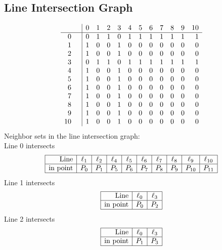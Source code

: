\documentclass{article}
\begin{document}
{\subsection*{Line Intersection Graph}
{\arraycolsep=1pt
$$
\begin{array}{rr|*{11}r}
 &  & 0 & 1 & 2 & 3 & 4 & 5 & 6 & 7 & 8 & 9 & 10\\
\hline
0 &  & 0 & 1 & 1 & 0 & 1 & 1 & 1 & 1 & 1 & 1 & 1\\
1 &  & 1 & 0 & 0 & 1 & 0 & 0 & 0 & 0 & 0 & 0 & 0\\
2 &  & 1 & 0 & 0 & 1 & 0 & 0 & 0 & 0 & 0 & 0 & 0\\
3 &  & 0 & 1 & 1 & 0 & 1 & 1 & 1 & 1 & 1 & 1 & 1\\
4 &  & 1 & 0 & 0 & 1 & 0 & 0 & 0 & 0 & 0 & 0 & 0\\
5 &  & 1 & 0 & 0 & 1 & 0 & 0 & 0 & 0 & 0 & 0 & 0\\
6 &  & 1 & 0 & 0 & 1 & 0 & 0 & 0 & 0 & 0 & 0 & 0\\
7 &  & 1 & 0 & 0 & 1 & 0 & 0 & 0 & 0 & 0 & 0 & 0\\
8 &  & 1 & 0 & 0 & 1 & 0 & 0 & 0 & 0 & 0 & 0 & 0\\
9 &  & 1 & 0 & 0 & 1 & 0 & 0 & 0 & 0 & 0 & 0 & 0\\
10 &  & 1 & 0 & 0 & 1 & 0 & 0 & 0 & 0 & 0 & 0 & 0\\
\end{array}
$$
}%
Neighbor sets in the line intersection graph:\\
Line 0 intersects 
$$
\begin{array}{|r*{9}{|c}|}
\hline
\mbox{Line}  & \ell_{1} & \ell_{2} & \ell_{4} & \ell_{5} & \ell_{6} & \ell_{7} & \ell_{8} & \ell_{9} & \ell_{10}\\
\hline
\mbox{in point}  & P_{0} & P_{1} & P_{5} & P_{6} & P_{7} & P_{8} & P_{9} & P_{10} & P_{11}\\
\hline
\end{array}
$$
Line 1 intersects 
$$
\begin{array}{|r*{2}{|c}|}
\hline
\mbox{Line}  & \ell_{0} & \ell_{3}\\
\hline
\mbox{in point}  & P_{0} & P_{2}\\
\hline
\end{array}
$$
Line 2 intersects 
$$
\begin{array}{|r*{2}{|c}|}
\hline
\mbox{Line}  & \ell_{0} & \ell_{3}\\
\hline
\mbox{in point}  & P_{1} & P_{3}\\
\hline
\end{array}
$$}
\end{document}
